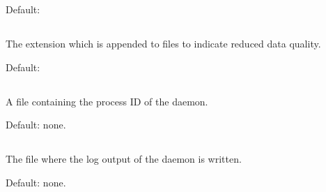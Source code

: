 Default: 

\subsection{}
The extension which is appended to files to indicate reduced data
quality.

Default: 

\subsection{}
A file containing the process ID of the 
daemon.

Default: none.

\subsection{}
The file where the log output of the 
daemon is written.

Default: none.

